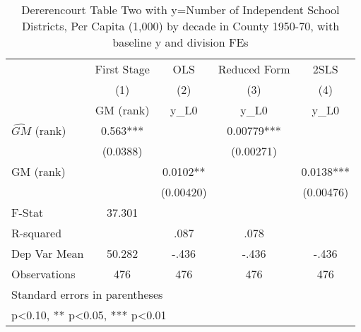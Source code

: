 \begin{table}[htbp]\centering
\def\sym#1{\ifmmode^{#1}\else\(^{#1}\)\fi}
\caption{Dererencourt Table Two with y=Number of Independent School Districts, Per Capita (1,000) by decade in County 1950-70, with baseline y and division FEs}
\begin{tabular}{l*{4}{c}}
\toprule
                    & First Stage   &         OLS   &Reduced Form   &        2SLS   \\
                    &\multicolumn{1}{c}{(1)}&\multicolumn{1}{c}{(2)}&\multicolumn{1}{c}{(3)}&\multicolumn{1}{c}{(4)}\\
                    &\multicolumn{1}{c}{GM  (rank)}&\multicolumn{1}{c}{y\_L0}&\multicolumn{1}{c}{y\_L0}&\multicolumn{1}{c}{y\_L0}\\
\midrule
$\hat{GM}$ (rank)   &       0.563***&               &     0.00779***&               \\
                    &    (0.0388)   &               &   (0.00271)   &               \\
\addlinespace
GM  (rank)          &               &      0.0102** &               &      0.0138***\\
                    &               &   (0.00420)   &               &   (0.00476)   \\
\midrule
F-Stat              &      37.301   &               &               &               \\
R-squared           &               &        .087   &        .078   &               \\
Dep Var Mean        &      50.282   &       -.436   &       -.436   &       -.436   \\
Observations        &         476   &         476   &         476   &         476   \\
\bottomrule
\multicolumn{5}{l}{\footnotesize Standard errors in parentheses}\\
\multicolumn{5}{l}{\footnotesize * p<0.10, ** p<0.05, *** p<0.01}\\
\end{tabular}
\end{table}
